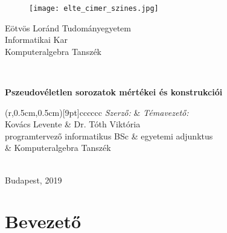 \documentclass[12pt]{article}
\begin{document}
	\makeatletter
	\renewcommand*{\thetable}{\arabic{table}}
	\renewcommand*{\thefigure}{\arabic{figure}}
	\let\c@table\c@figure
	\makeatother 
	\captionsetup[figure]{name=Ábra}
	\captionsetup[table]{name=Ábra}
	\sloppy
	\newcommand{\sectionbreak}{\clearpage}
	\begin{titlepage}
		\begin{minipage}{0.36\textwidth}
			\begin{figure}[H]
				\texttt{[image: elte\_cimer\_szines.jpg]}
			\end{figure}
		\end{minipage}
		\begin{minipage}{0.60\textwidth}
			\begin{center}
				{\Large Eötvös Loránd Tudományegyetem \\
					Informatikai Kar \\
					Komputeralgebra Tanszék \\}
			\end{center}
		\end{minipage}
		\\[0.3\baselineskip]
		\noindent\makebox[\linewidth]{\rule{\textwidth}{0.5pt}}
		\vspace*{\fill}
		\centering
		\vspace*{0.5cm}
		
		\huge\bfseries
		Pszeudovéletlen sorozatok mértékei és konstrukciói		
		\vspace*{0.5cm}
		
		\vspace*{\fill}
		\begin{TAB}(r,0.5cm,0.5cm)[9pt]{cc}{cccc}
			\normalfont \normalsize \textsl{ Szerző: } & \normalfont \normalsize \textsl{ Témavezető: } \\
			\normalsize Kovács Levente & \normalsize Dr. Tóth Viktória \\
			\normalfont \normalsize programtervező informatikus BSc & \normalfont \normalsize egyetemi adjunktus \\
			\normalsize & \normalfont \normalsize Komputeralgebra Tanszék
		\end{TAB}
		\\
		\large \normalfont Budapest, 2019
	\end{titlepage}
	\renewcommand*\contentsname{Tartalomjegyzék}
	\tableofcontents
	\newpage
	\section{Bevezető}
\end{document}
